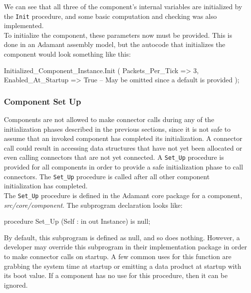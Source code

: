 We can see that all three of the component's internal variables are initialized by the \texttt{Init} procedure, and some basic computation and checking was also implemented. \\

To initialize the component, these parameters now must be provided. This is done in an Adamant assembly model, but the autocode that initializes the component would look something like this:

\vspace{5mm} %
\begin{adacode}
  Initialized_Component_Instance.Init (
    Packets_Per_Tick => 3,
    Enabled_At_Startup => True -- May be omitted since a default is provided
  );
\end{adacode}
\vspace{5mm} %

\subsubsection{Component Set Up} \label{Component Set Up}

Components are not allowed to make connector calls during any of the initialization phases described in the previous sections, since it is not safe to assume that an invoked component has completed its initialization. A connector call could result in accessing data structures that have not yet been allocated or even calling connectors that are not yet connected. A \texttt{Set\_Up} procedure is provided for all components in order to provide a safe initialization phase to call connectors. The \texttt{Set\_Up} procedure is called after all other component initialization has completed. \\

The \texttt{Set\_Up} procedure is defined in the Adamant core package for a component, \textit{src/core/component}. The subprogram declaration looks like:

\vspace{5mm} %
\begin{adacode}
procedure Set_Up (Self : in out Instance) is null;
\end{adacode}
\vspace{5mm} %

By default, this subprogram is defined as null, and so does nothing. However, a developer may override this subprogram in their implementation package in order to make connector calls on startup. A few common uses for this function are grabbing the system time at startup or emitting a data product at startup with its boot value. If a component has no use for this procedure, then it can be ignored.

